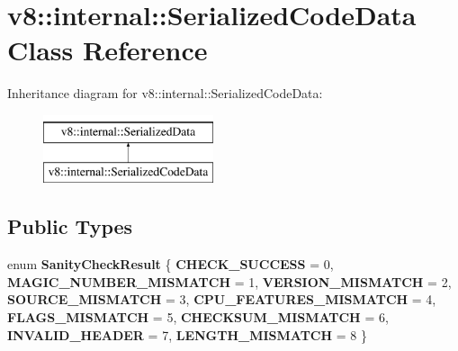 \hypertarget{classv8_1_1internal_1_1SerializedCodeData}{}\section{v8\+:\+:internal\+:\+:Serialized\+Code\+Data Class Reference}
\label{classv8_1_1internal_1_1SerializedCodeData}
Inheritance diagram for v8\+:\+:internal\+:\+:Serialized\+Code\+Data\+:\begin{figure}[H]
\begin{center}
\leavevmode
\includegraphics[height=2.000000cm]{classv8_1_1internal_1_1SerializedCodeData}
\end{center}
\end{figure}
\subsection*{Public Types}
\begin{DoxyCompactItemize}
\item 
\mbox{\label{classv8_1_1internal_1_1SerializedCodeData_a5f99aa9dffa478e9ae70db3ce97bf214}} 
enum {\bfseries Sanity\+Check\+Result} \{ \newline
{\bfseries C\+H\+E\+C\+K\+\_\+\+S\+U\+C\+C\+E\+SS} = 0, 
{\bfseries M\+A\+G\+I\+C\+\_\+\+N\+U\+M\+B\+E\+R\+\_\+\+M\+I\+S\+M\+A\+T\+CH} = 1, 
{\bfseries V\+E\+R\+S\+I\+O\+N\+\_\+\+M\+I\+S\+M\+A\+T\+CH} = 2, 
{\bfseries S\+O\+U\+R\+C\+E\+\_\+\+M\+I\+S\+M\+A\+T\+CH} = 3, 
\newline
{\bfseries C\+P\+U\+\_\+\+F\+E\+A\+T\+U\+R\+E\+S\+\_\+\+M\+I\+S\+M\+A\+T\+CH} = 4, 
{\bfseries F\+L\+A\+G\+S\+\_\+\+M\+I\+S\+M\+A\+T\+CH} = 5, 
{\bfseries C\+H\+E\+C\+K\+S\+U\+M\+\_\+\+M\+I\+S\+M\+A\+T\+CH} = 6, 
{\bfseries I\+N\+V\+A\+L\+I\+D\+\_\+\+H\+E\+A\+D\+ER} = 7, 
\newline
{\bfseries L\+E\+N\+G\+T\+H\+\_\+\+M\+I\+S\+M\+A\+T\+CH} = 8
 \}
\end{DoxyCompactItemize}
